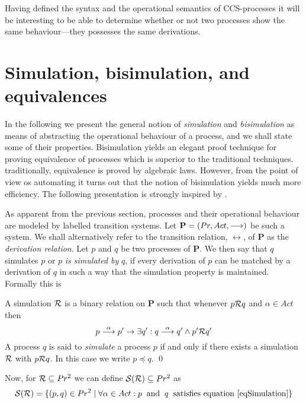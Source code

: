 Having defined the syntax and the operational semantics of CCS-processes it will be interesting to be able to determine whether or not two processes show the same behaviour---they possesses the same derivations.


\section{Simulation, bisimulation, and equivalences}

In the following we present the general notion of {\it simulation\/} and {\it bisimulation\/} as means of abstracting the operational behaviour of a process, and we shall state some of their properties. Bisimulation yields an elegant proof technique for proving equivalence of processes which is superior to the traditional techniques. traditionally, equivalence is proved by algebraic laws. However, from the point of view os automating it turns out that the notion of bisimulation yields much more efficiency. The following presentation is strongly inspired by \cite{Larsen}.

As apparent from the previous section, processes and their operational behaviour are modeled by labelled transition systems. Let $\hbox{\bf P} = ( 
Pr, Act, \stackrel{}{\longrightarrow})$ be such a system. We shall alternatively refer to the transition relation, $\rel{}$, of {\bf P} as the {\it derivation relation}. Let $p$ and $q$ be two processes of {\bf P}. We then say that $q$ simulates $p$ or $p$ {\it is simulated by\/} $q$, if every derivation of $p$ can be matched by a derivation of $q$ in such a way that the simulation property is maintained. Formally this is

\begin{definition}[Simulation]\label{defSimulation}
A simulation $\cal R$ is a binary relation on \hbox{\bf P} such that whenever $p{\cal R}q$ and $\alpha\in Act$ then
\begin{equation}
p\stackrel{\alpha}{\longrightarrow}p' \rightarrow \exists q': q\stackrel{\alpha}{\longrightarrow}q' \wedge p'{\cal R}q'
\label{eqSimulation}
\end{equation}
A process $q$ is said to {\em simulate\/} a process $p$ if and only if there exists a simulation $\cal R$ with $p{\cal R}q$. In this case we write $p\preceq q$.
\qed
\end{definition}

\noindent
Now, for ${\cal R}\subseteq Pr^2$ we can define ${\cal S(R)}\subseteq Pr^2$ as
\begin{equation}
{\cal S(R)} = \{(p,q)\in Pr^2\mid\forall\alpha\in Act : p\;\;\hbox{and}\;\; q\;\;\hbox{satisfies equation~\ref{eqSimulation}}\}
\end{equation}

